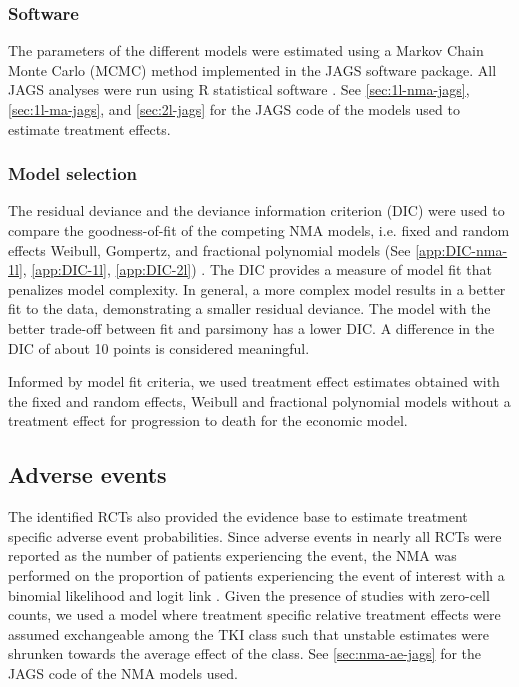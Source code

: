\documentclass[11pt,final,fleqn]{article}\usepackage[]{graphicx}\usepackage[]{color}
\theoremstyle{plain}
\newcommand\R{{\textsf{R}}}
\begin{document}
{\subsubsection{Software}
The parameters of the different models were estimated using a Markov Chain Monte Carlo (MCMC) method implemented in the JAGS software package. All JAGS analyses were run using \R{} statistical software \citep{team2014r}. See \autoref{sec:1l-nma-jags}, \autoref{sec:1l-ma-jags}, and \autoref{sec:2l-jags} for the JAGS code of the models used to estimate treatment effects.

\subsubsection{Model selection}
The residual deviance and the deviance information criterion (DIC) were used to compare the goodness-of-fit of the competing NMA models, i.e. fixed and random effects Weibull, Gompertz, and fractional polynomial models (See \autoref{app:DIC-nma-1l}, \autoref{app:DIC-1l}, \autoref{app:DIC-2l}) \citep{dias2018network}. The DIC provides a measure of model fit that penalizes model complexity. In general, a more complex model results in a better fit to the data, demonstrating a smaller residual deviance. The model with the better trade-off between fit and parsimony has a lower DIC. A difference in the DIC of about 10 points is considered meaningful. 

Informed by model fit criteria, we used treatment effect estimates obtained with the fixed and random effects, Weibull and fractional polynomial models without a treatment effect for progression to death for the economic model. 


\subsection{Adverse events}\label{subsec:data-aes}
The identified RCTs also provided the evidence base to estimate treatment specific adverse event probabilities. Since adverse events in nearly all RCTs were reported as the number of patients experiencing the event, the NMA was performed on the proportion of patients experiencing the event of interest with a binomial likelihood and logit link \citep[Chapter~2]{dias2018network}. Given the presence of studies with zero-cell counts, we used a model where treatment specific relative treatment effects were assumed exchangeable among the TKI class such that unstable estimates were shrunken towards the average effect of the class. See \autoref{sec:nma-ae-jags} for the JAGS code of the NMA models used.

}
\end{document}
